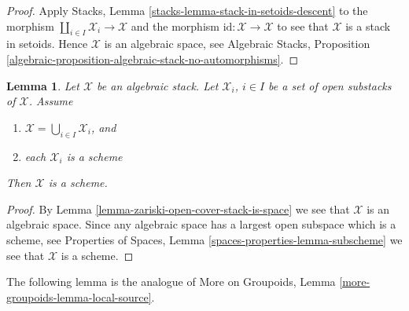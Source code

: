 \documentclass{stacks-project}
\theoremstyle{plain}
\newtheorem{lemma}[subsection]{Lemma}
\theoremstyle{definition}
\theoremstyle{remark}
\numberwithin{equation}{subsection}
\begin{document}
\begin{proof}
Apply
Stacks, Lemma \ref{stacks-lemma-stack-in-setoids-descent}
to the morphism $\coprod_{i \in I} \mathcal{X}_i \to \mathcal{X}$
and the morphism $\text{id} : \mathcal{X} \to \mathcal{X}$ to
see that $\mathcal{X}$ is a stack in setoids.
Hence $\mathcal{X}$ is an algebraic space, see
Algebraic Stacks,
Proposition \ref{algebraic-proposition-algebraic-stack-no-automorphisms}.
\end{proof}

\begin{lemma}
\label{lemma-zariski-open-cover-stack-is-scheme}
Let $\mathcal X$ be an algebraic stack.
Let $\mathcal{X}_i$, $i \in I$ be a set of open substacks of $\mathcal{X}$.
Assume
\begin{enumerate}
\item $\mathcal{X} = \bigcup_{i \in I} \mathcal{X}_i$, and
\item each $\mathcal{X}_i$ is a scheme
\end{enumerate}
Then $\mathcal{X}$ is a scheme.
\end{lemma}

\begin{proof}
By
Lemma \ref{lemma-zariski-open-cover-stack-is-space}
we see that $\mathcal{X}$ is an algebraic space. Since any algebraic
space has a largest open subspace which is a scheme, see
Properties of Spaces, Lemma \ref{spaces-properties-lemma-subscheme}
we see that $\mathcal{X}$ is a scheme.
\end{proof}


\noindent
The following lemma is the analogue of
More on Groupoids, Lemma \ref{more-groupoids-lemma-local-source}.
\end{document}

